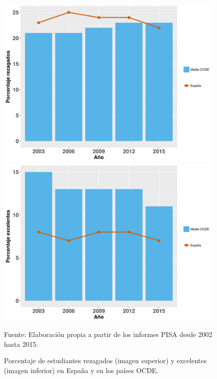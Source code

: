 \begin{figure}[hbt]
\centering
\caption{Porcentaje de estudiantes rezagados (imagen superior) y excelentes (imagen inferior) en España y en los países OCDE. }
\label{fig::PisaRezEx}
\includegraphics[scale=0.45]{img/PisaRezagados.png}
\includegraphics[scale=0.45]{img/PisaExcelentes.png}

\vspace{-0.5cm}
\small{Fuente: Elaboración propia a partir de los informes PISA desde 2002 hasta 2015.}
\end{figure}
\FloatBarrier




